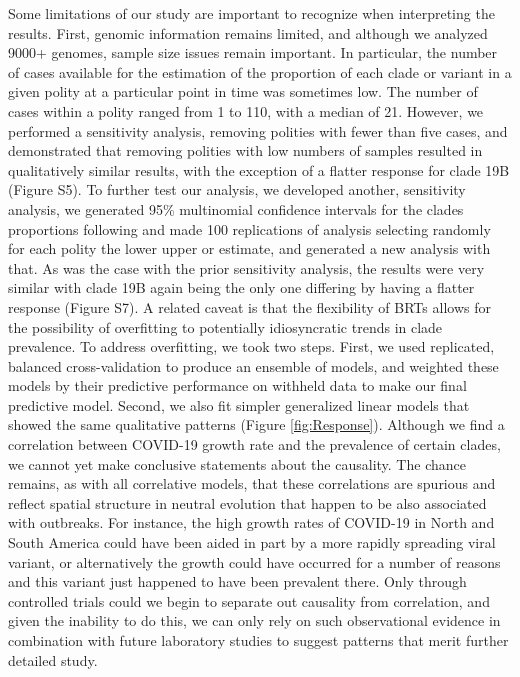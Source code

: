 \documentclass[9pt,twocolumn,twoside,lineno]{pnas-new}
\begin{document}
Some limitations of our study are important to recognize when interpreting the results. First, genomic information remains limited, and although we analyzed 9000+ genomes, sample size issues remain important. In particular, the number of cases available for the estimation of the proportion of each clade or variant in a given polity at a particular point in time was sometimes low. The number of cases within a polity ranged from 1 to 110, with a median of 21. However, we performed a sensitivity analysis, removing polities with fewer than five cases, and demonstrated that removing polities with low numbers of samples resulted in qualitatively similar results, with the exception of a flatter response for clade 19B (Figure S5). To further test our analysis, we developed another, sensitivity analysis, we generated 95\% multinomial confidence intervals for the clades proportions following \cite{sison1995simultaneous} and made 100 replications of analysis selecting randomly for each polity the lower upper or estimate, and generated a new analysis with that. As was the case with the prior sensitivity analysis, the results were very similar with clade 19B again being the only one differing by having a flatter response (Figure S7).  A related caveat is that the flexibility of BRTs allows for the possibility of overfitting to potentially idiosyncratic trends in clade prevalence. To address overfitting, we took two steps. First, we used replicated, balanced cross-validation to produce an ensemble of models, and weighted these models by their predictive performance on withheld data to make our final predictive model. Second, we also fit simpler generalized linear models that showed the same qualitative patterns (Figure \ref{fig:Response}). Although we find a correlation between COVID-19 growth rate and the prevalence of certain clades, we cannot yet make conclusive statements about the causality. The chance remains, as with all correlative models, that these correlations are spurious and reflect spatial structure in neutral evolution that happen to be also associated with outbreaks. For instance, the high growth rates of COVID-19 in North and South America could have been aided in part by a more rapidly spreading viral variant, or alternatively the growth could have occurred for a number of reasons and this variant just happened to have been prevalent there. Only through controlled trials could we begin to separate out causality from correlation, and given the inability to do this, we can only rely on such observational evidence in combination with future laboratory studies to suggest patterns that merit further detailed study.
\end{document}
